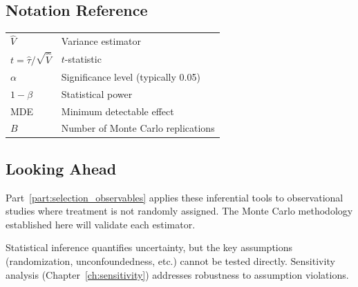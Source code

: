 \subsection{Notation Reference}

\begin{center}
\begin{tabular}{ll}
$\hat{V}$ & Variance estimator \\
$t = \hat{\tau}/\sqrt{\hat{V}}$ & $t$-statistic \\
$\alpha$ & Significance level (typically 0.05) \\
$1 - \beta$ & Statistical power \\
MDE & Minimum detectable effect \\
$B$ & Number of Monte Carlo replications
\end{tabular}
\end{center}

\subsection{Looking Ahead}

Part~\ref{part:selection_observables} applies these inferential tools to observational studies where treatment is not randomly assigned. The Monte Carlo methodology established here will validate each estimator.

\begin{insight}
Statistical inference quantifies uncertainty, but the key assumptions (randomization, unconfoundedness, etc.) cannot be tested directly. Sensitivity analysis (Chapter~\ref{ch:sensitivity}) addresses robustness to assumption violations.
\end{insight}
